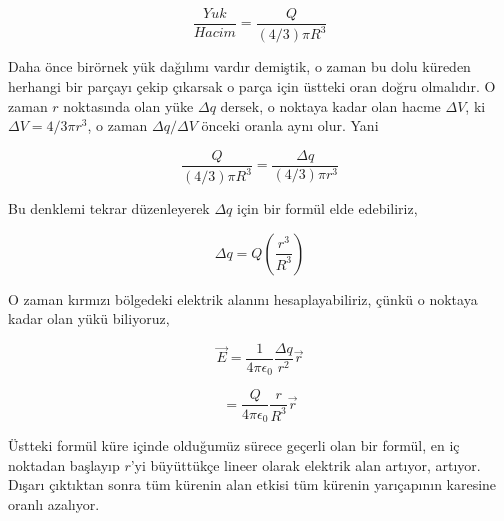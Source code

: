 \documentclass[12pt,fleqn]{article}\usepackage{../../common}
\begin{document}
$$
\frac{Yuk}{Hacim} = \frac{Q}{(4/3)\pi R^3}
$$

Daha önce birörnek yük dağılımı vardır demiştik, o zaman bu dolu küreden
herhangi bir parçayı çekip çıkarsak o parça için üstteki oran doğru olmalıdır. O
zaman $r$ noktasında olan yüke $\Delta q$ dersek, o noktaya kadar olan hacme
$\Delta V$, ki $\Delta V = 4/3 \pi r^3$, o zaman $\Delta q / \Delta V$ önceki
oranla aynı olur. Yani

$$
\frac{Q}{(4/3)\pi R^3} = \frac{\Delta q}{(4/3)\pi r^3}
$$

Bu denklemi tekrar düzenleyerek $\Delta q$ için bir formül elde edebiliriz, 

$$
\Delta q = Q \left( \frac{r^3}{R^3} \right)
$$

O zaman kırmızı bölgedeki elektrik alanını hesaplayabiliriz, çünkü o noktaya
kadar olan yükü biliyoruz,

$$
\vec{E} = \frac{1}{4\pi\epsilon_0} \frac{\Delta q}{r^2} \vec{r}
$$

$$
= \frac{Q}{4\pi\epsilon_0} \frac{r}{R^3} \vec{r}
$$

Üstteki formül küre içinde olduğumüz sürece geçerli olan bir formül, en iç
noktadan başlayıp $r$'yi büyüttükçe lineer olarak elektrik alan artıyor,
artıyor. Dışarı çıktıktan sonra tüm kürenin alan etkisi tüm kürenin yarıçapının
karesine oranlı azalıyor. 
\end{document}
